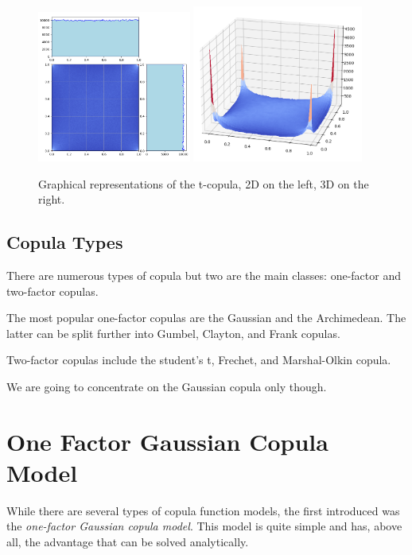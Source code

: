 \begin{figure}[htbp]
\centering
\includegraphics[width=0.45\textwidth]{figures/t-copula_2d}
\quad
\includegraphics[width=0.5\textwidth]{figures/t-copula_3d}
\caption{Graphical representations of the t-copula, 2D on the left, 3D on the right.}
\label{fig:t-copula}
\end{figure}

\subsection{Copula Types}
There are numerous types of copula but two are the main classes: one-factor and two-factor copulas.

The most popular one-factor copulas are the Gaussian and the Archimedean. The latter can be split further into Gumbel, Clayton, and Frank copulas.

Two-factor copulas include the student’s t, Frechet, and Marshal-Olkin copula. 

We are going to concentrate on the Gaussian copula only though.

\section{One Factor Gaussian Copula Model}
While there are several types of copula function models, the first introduced was the \emph{one-factor Gaussian copula model}. This model is quite simple and has, above all, the advantage that can be solved analytically. 

